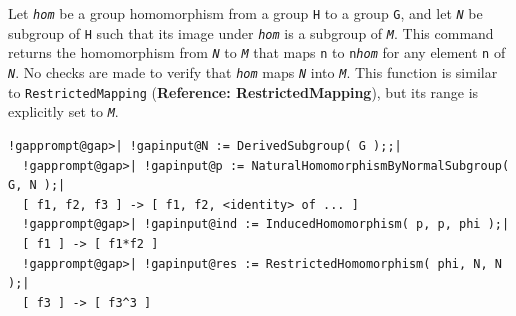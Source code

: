 \documentclass[a4paper,11pt]{report}
\begin{document}
{{{ Let \mbox{\texttt{\mdseries\slshape hom}} be a group homomorphism from a group \texttt{H} to a group \texttt{G}, and let \mbox{\texttt{\mdseries\slshape N}} be subgroup of \texttt{H} such that its image under \mbox{\texttt{\mdseries\slshape hom}} is a subgroup of \mbox{\texttt{\mdseries\slshape M}}. This command returns the homomorphism from \mbox{\texttt{\mdseries\slshape N}} to \mbox{\texttt{\mdseries\slshape M}} that maps \texttt{n} to \texttt{n\texttt{}\mbox{\texttt{\mdseries\slshape hom}}} for any element \texttt{n} of \mbox{\texttt{\mdseries\slshape N}}. No checks are made to verify that \mbox{\texttt{\mdseries\slshape hom}} maps \mbox{\texttt{\mdseries\slshape N}} into \mbox{\texttt{\mdseries\slshape M}}. This function is similar to \texttt{RestrictedMapping} (\textbf{Reference: RestrictedMapping}), but its range is explicitly set to \mbox{\texttt{\mdseries\slshape M}}. }

 
\begin{Verbatim}[commandchars=!@|,fontsize=\small,frame=single,label=Example]
  !gapprompt@gap>| !gapinput@N := DerivedSubgroup( G );;|
  !gapprompt@gap>| !gapinput@p := NaturalHomomorphismByNormalSubgroup( G, N );|
  [ f1, f2, f3 ] -> [ f1, f2, <identity> of ... ]
  !gapprompt@gap>| !gapinput@ind := InducedHomomorphism( p, p, phi );|
  [ f1 ] -> [ f1*f2 ]
  !gapprompt@gap>| !gapinput@res := RestrictedHomomorphism( phi, N, N );|
  [ f3 ] -> [ f3^3 ]
\end{Verbatim}
 }

 }

   
\end{document}
